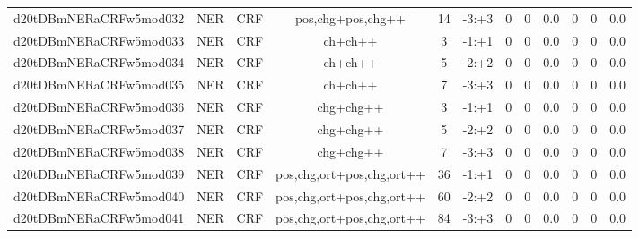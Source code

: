 \documentclass[a4paper]{article}
\begin{document}
\begin{landscape}
\begin{center}
\begin{tabular}{ |c|c|c|c|c|c|c|c|c|c|c|c|}
 
 	
 	\small{ d20tDBmNERaCRFw5mod032 } & \small{ NER} & \small{  CRF }  & pos,chg+pos,chg++  &  14 &  \small{  -3:+3 }  &  0 & 0 & 0.0  &  0 & 0 & 0.0 \\
 	

 
 	
 	\small{ d20tDBmNERaCRFw5mod033 } & \small{ NER} & \small{  CRF }  & ch+ch++  &  3 &  \small{  -1:+1 }  &  0 & 0 & 0.0  &  0 & 0 & 0.0 \\
 	

 
 	
 	\small{ d20tDBmNERaCRFw5mod034 } & \small{ NER} & \small{  CRF }  & ch+ch++  &  5 &  \small{  -2:+2 }  &  0 & 0 & 0.0  &  0 & 0 & 0.0 \\
 	

 
 	
 	\small{ d20tDBmNERaCRFw5mod035 } & \small{ NER} & \small{  CRF }  & ch+ch++  &  7 &  \small{  -3:+3 }  &  0 & 0 & 0.0  &  0 & 0 & 0.0 \\
 	

 
 	
 	\small{ d20tDBmNERaCRFw5mod036 } & \small{ NER} & \small{  CRF }  & chg+chg++  &  3 &  \small{  -1:+1 }  &  0 & 0 & 0.0  &  0 & 0 & 0.0 \\
 	

 
 	
 	\small{ d20tDBmNERaCRFw5mod037 } & \small{ NER} & \small{  CRF }  & chg+chg++  &  5 &  \small{  -2:+2 }  &  0 & 0 & 0.0  &  0 & 0 & 0.0 \\
 	

 
 	
 	\small{ d20tDBmNERaCRFw5mod038 } & \small{ NER} & \small{  CRF }  & chg+chg++  &  7 &  \small{  -3:+3 }  &  0 & 0 & 0.0  &  0 & 0 & 0.0 \\
 	

 
 	
 	\small{ d20tDBmNERaCRFw5mod039 } & \small{ NER} & \small{  CRF }  & pos,chg,ort+pos,chg,ort++  &  36 &  \small{  -1:+1 }  &  0 & 0 & 0.0  &  0 & 0 & 0.0 \\
 	

 
 	
 	\small{ d20tDBmNERaCRFw5mod040 } & \small{ NER} & \small{  CRF }  & pos,chg,ort+pos,chg,ort++  &  60 &  \small{  -2:+2 }  &  0 & 0 & 0.0  &  0 & 0 & 0.0 \\
 	

 
 	
 	\small{ d20tDBmNERaCRFw5mod041 } & \small{ NER} & \small{  CRF }  & pos,chg,ort+pos,chg,ort++  &  84 &  \small{  -3:+3 }  &  0 & 0 & 0.0  &  0 & 0 & 0.0 \\
 	


\end{tabular}
\end{center}
\end{landscape}
\end{document}

